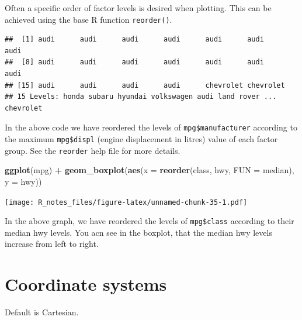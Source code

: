 \documentclass[]{book}
\newenvironment{Shaded}{\begin{snugshade}}{\end{snugshade}}
\newcommand{\KeywordTok}[1]{\textcolor[rgb]{0.13,0.29,0.53}{\textbf{#1}}}
\newcommand{\DataTypeTok}[1]{\textcolor[rgb]{0.13,0.29,0.53}{#1}}
\newcommand{\DecValTok}[1]{\textcolor[rgb]{0.00,0.00,0.81}{#1}}
\newcommand{\StringTok}[1]{\textcolor[rgb]{0.31,0.60,0.02}{#1}}
\newcommand{\OperatorTok}[1]{\textcolor[rgb]{0.81,0.36,0.00}{\textbf{#1}}}
\newcommand{\NormalTok}[1]{#1}
\begin{document}
Often a specific order of factor levels is desired when plotting. This
can be achieved using the base R function \texttt{reorder()}.

\begin{Shaded}
\end{Shaded}

\begin{verbatim}
##  [1] audi      audi      audi      audi      audi      audi      audi     
##  [8] audi      audi      audi      audi      audi      audi      audi     
## [15] audi      audi      audi      audi      chevrolet chevrolet
## 15 Levels: honda subaru hyundai volkswagen audi land rover ... chevrolet
\end{verbatim}

In the above code we have reordered the levels of
\texttt{mpg\$manufacturer} according to the maximum \texttt{mpg\$displ}
(engine displacement in litres) value of each factor group. See the
\texttt{reorder} help file for more details.

\begin{Shaded}
\begin{Highlighting}[]
\KeywordTok{ggplot}\NormalTok{(mpg) }\OperatorTok{+}
\StringTok{  }\KeywordTok{geom_boxplot}\NormalTok{(}\KeywordTok{aes}\NormalTok{(}\DataTypeTok{x =} \KeywordTok{reorder}\NormalTok{(class, hwy, }\DataTypeTok{FUN =}\NormalTok{ median), }\DataTypeTok{y =}\NormalTok{ hwy))}
\end{Highlighting}
\end{Shaded}

\texttt{[image: R\_notes\_files/figure-latex/unnamed-chunk-35-1.pdf]}

In the above graph, we have reordered the levels of \texttt{mpg\$class}
according to their median hwy levels. You acn see in the boxplot, that
the median hwy levels increase from left to right.

\section{Coordinate systems}\label{coordinate-systems}

Default is Cartesian.
\end{document}
